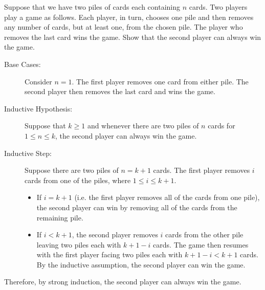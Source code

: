 \documentclass{article}
\theoremstyle{definition}
\begin{document}
\begin{question}
    Suppose that we have two piles of cards each containing $n$ cards. Two players play a game as follows. Each player, in turn, chooses one pile and then removes any number of cards, but at least one, from the chosen pile. The player who removes the last card wins the game. Show that the second player can always win the game.
\end{question}
\begin{solution}
	\begin{description}
	\item[Base Cases: ] Consider $n=1$. The first player removes one card from either pile. The second player then removes the last card and wins the game.
	
	\item[Inductive Hypothesis: ] Suppose that $k\geq 1$ and whenever there are two piles of $n$ cards for $1\leq n\leq k$, the second player can always win the game.
	
	\item[Inductive Step: ] Suppose there are two piles of $n=k+1$ cards. The first player removes $i$ cards from one of the piles, where $1\leq i\leq k+1$. 
	\begin{itemize}
	\item If $i=k+1$ (i.e. the first player removes all of the cards from one pile), the second player can win by removing all of the cards from the remaining pile. 
	\item If $i<k+1$, the second player removes $i$ cards from the other pile leaving two piles each with $k+1-i$ cards. The game then resumes with the first player facing two piles each with $k+1-i<k+1$ cards. By the inductive assumption, the second player can win the game.
	\end{itemize}
	\end{description}
	Therefore, by strong induction, the second player can always win the game.
\end{solution}
\end{document}
